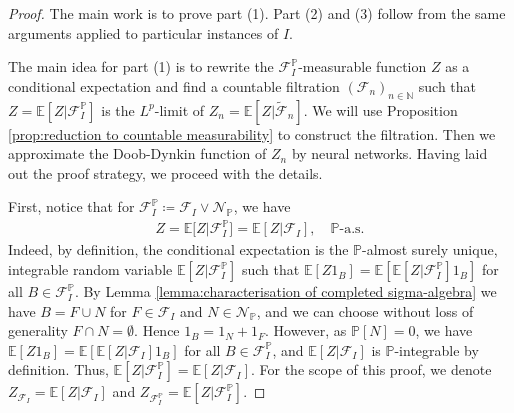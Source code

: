 \documentclass[11pt,a4paper,twoside,openany]{report}
\numberwithin{equation}{section}
\theoremstyle{plain} %
\theoremstyle{definition} %
\theoremstyle{remark} %
\begin{document}
\begin{proof}   
The main work is to prove part (1). Part (2) and (3) follow from the same arguments applied to particular instances of \(I\). 


The main idea for part (1) is to rewrite the \(\mathcal{F}_I^{\mathbb{P}}\)-measurable function \(Z\) as a conditional expectation and find a countable filtration \((\mathcal{F}_n)_{n\in\mathbb{N}}\) such that \(Z=\mathbb{E}[Z|\mathcal{F}_I^{\mathbb{P}}]\) is the \(L^p\)-limit of \(Z_n=\mathbb{E}[Z|\widetilde{\mathcal{F}}_n]\). We will use Proposition \ref{prop:reduction to countable measurability} to construct the filtration. Then we approximate the Doob-Dynkin function of \(Z_n\) by neural networks. Having laid out the proof strategy, we proceed with the details.


First, notice that for \(\mathcal{F}_I^{\mathbb{P}}\coloneqq\mathcal{F}_I\vee\mathcal{N}_{\mathbb{P}}\), we have
\begin{align*}
    Z=\mathbb{E}\Big[Z\big|\mathcal{F}_I^{\mathbb{P}}\Big]=\mathbb{E}[Z|\mathcal{F}_I],\quad\mathbb{P}\text{-a.s.} 
\end{align*}
Indeed, by definition, the conditional expectation is the \(\mathbb{P}\)-almost surely unique, integrable random variable \(\mathbb{E}[Z|\mathcal{F}_I^{\mathbb{P}}]\) such that \(\mathbb{E}[Z1_B]=\mathbb{E}[\mathbb{E}[Z|\mathcal{F}_I^{\mathbb{P}}]1_B]\) for all \(B\in\mathcal{F}_I^{\mathbb{P}}\). By Lemma \ref{lemma:characterisation of completed sigma-algebra} we have \(B=F\cup N\) for \(F\in\mathcal{F}_I\) and \(N\in\mathcal{N}_{\mathbb{P}}\), and we can choose without loss of generality \(F\cap N=\emptyset\). Hence \(1_{B}=1_N+1_F\). However, as \(\mathbb{P}[N]=0\), we have \(\mathbb{E}[Z1_B]=\mathbb{E}[\mathbb{E}[Z|\mathcal{F}_I]1_B]\) for all \(B\in\mathcal{F}_{I}^{\mathbb{P}}\), and \(\mathbb{E}[Z|\mathcal{F}_I]\) is \(\mathbb{P}\)-integrable by definition. Thus, \(\mathbb{E}[Z|\mathcal{F}_I^{\mathbb{P}}]=\mathbb{E}[Z|\mathcal{F}_I]\). For the scope of this proof, we denote \(Z_{\mathcal{F}_I}=\mathbb{E}[Z|\mathcal{F}_I]\) and \(Z_{\mathcal{F}_I^{\mathbb{P}}}=\mathbb{E}[Z|\mathcal{F}_I^{\mathbb{P}}]\).



\end{proof}
\end{document}

